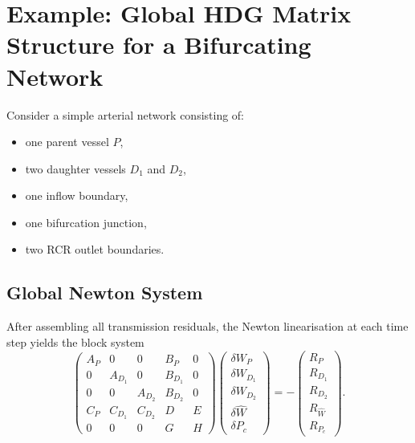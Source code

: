 \documentclass[11pt]{article}
\begin{document}
\section{Example: Global HDG Matrix Structure for a Bifurcating Network}

Consider a simple arterial network consisting of:
\begin{itemize}
\item one parent vessel $P$,
\item two daughter vessels $D_1$ and $D_2$,
\item one inflow boundary,
\item one bifurcation junction,
\item two RCR outlet boundaries.
\end{itemize}

\subsection{Global Newton System}

After assembling all transmission residuals, the Newton linearisation
at each time step yields the block system
\begin{equation}
\begin{pmatrix}
A_P    & 0      & 0      & B_P     & 0   \\
0      & A_{D_1}& 0      & B_{D_1} & 0   \\
0      & 0      & A_{D_2}& B_{D_2} & 0   \\
C_P    & C_{D_1}& C_{D_2}& D       & E   \\
0      & 0      & 0      & G       & H
\end{pmatrix}
\begin{pmatrix}
\delta W_P \\ \delta W_{D_1} \\ \delta W_{D_2} \\ \delta\widehat{W} \\ \delta P_c
\end{pmatrix}
=
-
\begin{pmatrix}
R_P \\ R_{D_1} \\ R_{D_2} \\ R_{\widehat{W}} \\ R_{P_c}
\end{pmatrix}.
\label{eq:block_hdg_system}
\end{equation}
\end{document}
